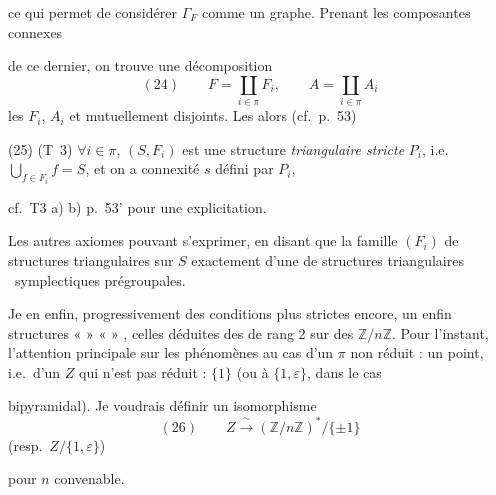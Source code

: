 \documentclass[11pt,a4paper]{article}
\begin{document}
ce qui permet de considérer $\Gamma_F$ comme
un graphe. Prenant les composantes connexes

de ce dernier, on trouve une décomposition
\[
(24)\qquad F=\coprod_{i\in\pi}F_i, \qquad A=\coprod_{i\in\pi}A_i
\]
les $F_i$, $A_i$  et mutuellement disjoints.
Les  alors (cf.\ p.~53)

(25) (T~3) $\forall i\in\pi$, $(S,F_i)$ est une structure
\emph{triangulaire stricte} $P_i$, i.e.\ $\bigcup_{f\in F_i}f=S$, et
on a connexité 
$s$ défini par $P_i$,

cf.\ T3 a) b) p.~53' pour une explicitation.

Les autres axiomes pouvant s'exprimer, en
disant que la famille $(F_i)$ de structures
triangulaires sur $S$ \struck{\ill{}}  exactement d'une 
 \ill{} de structures triangulaires
\ symplectiques prégroupales.

Je  en  enfin, progressivement
des conditions plus strictes encore,
 un  enfin  structures «  »
\struck{\ill{} \ill{} \ill{} \ill{}} «  » \ill{}
, celles déduites des 
  de rang 2 sur des $\mathbb{Z}/n\mathbb{Z}$. Pour
l'instant, l'attention principale \struck{\ill{}} 
sur les phénomènes \ill{} au cas d'un $\pi$ non
réduit : un point, i.e.\ d'un $Z$ qui n'est
pas réduit : $\{1\}$ (ou à $\{1,\varepsilon\}$, dans le cas

bipyramidal). Je voudrais  \add{\ill{}}
définir un isomorphisme
\[
(26)\qquad Z \xrightarrow{\ \sim\ } (\mathbb{Z}/n\mathbb{Z})^{*}/\{\pm 1\}
\]
\quad (resp.\ $Z/\{1,\varepsilon\}$)

pour $n$ convenable.
\end{document}
